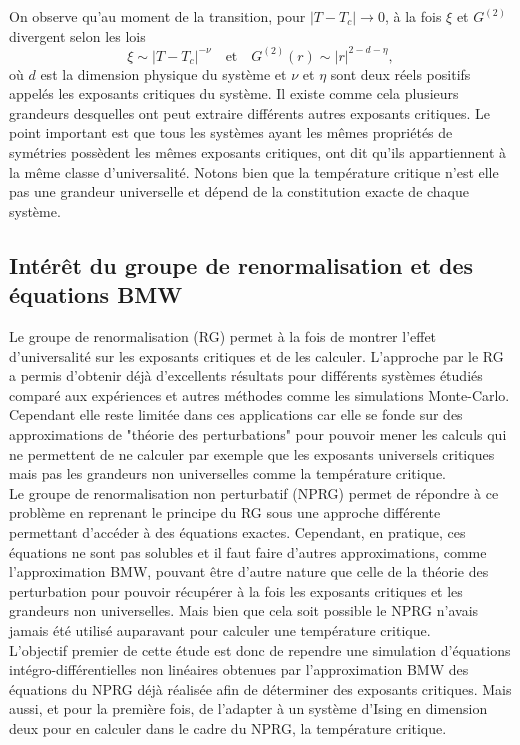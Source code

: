 \documentclass[10pt]{article}
\begin{document}
\begin{multicols}{2}
On observe qu'au moment de la transition, pour $|T-T_c| \rightarrow 0$, à la fois $\xi$ et $G^{(2)}$ divergent selon les lois 
\begin{equation}
	\xi \sim |T-T_c|^{-\nu} 	\quad \text{et} \quad G^{(2)}(r) \sim |r|^{2-d-\eta},
\end{equation}
où $d$ est la dimension physique du système et $\nu$ et $\eta$ sont deux réels positifs appelés les exposants critiques du système. Il existe comme cela plusieurs grandeurs desquelles ont peut extraire différents autres exposants critiques. Le point important est que tous les systèmes ayant les mêmes propriétés de symétries possèdent les mêmes exposants critiques, ont dit qu'ils appartiennent à la même classe d'universalité. Notons bien que la température critique n'est elle pas une grandeur universelle et dépend de la constitution exacte de chaque système.\\


\subsection{Intérêt du groupe de renormalisation et des équations BMW}
Le groupe de renormalisation (RG) permet à la fois de montrer l'effet d'universalité sur les exposants critiques et de les calculer. L'approche par le RG a permis d'obtenir déjà d'excellents résultats \cite{} pour différents systèmes étudiés comparé aux expériences et autres méthodes comme les simulations Monte-Carlo. Cependant elle reste limitée dans ces applications car elle se fonde sur des approximations de "théorie des perturbations" pour pouvoir mener les calculs qui ne permettent de ne calculer par exemple que les exposants universels critiques mais pas les grandeurs non universelles comme la température critique.\\

Le groupe de renormalisation non perturbatif (NPRG) permet de répondre à ce problème en reprenant le principe du RG sous une approche différente permettant d'accéder à des équations exactes. Cependant, en pratique, ces équations ne sont pas solubles et il faut faire d'autres approximations, comme l'approximation BMW, pouvant être d'autre nature que celle de la théorie des perturbation pour pouvoir récupérer à la fois les exposants critiques et les grandeurs non universelles. Mais bien que cela soit possible le NPRG n'avais jamais été utilisé auparavant pour calculer une température critique. \\

L'objectif premier de cette étude est donc de rependre une simulation d'équations intégro-différentielles non linéaires obtenues par l'approximation BMW des équations du NPRG déjà réalisée \cite{LeonardThesis} afin de déterminer des exposants critiques. Mais aussi, et pour la première fois, de l'adapter à un système d'Ising en dimension deux pour en calculer dans le cadre du NPRG, la température critique. \\


\end{multicols}
\end{document}
